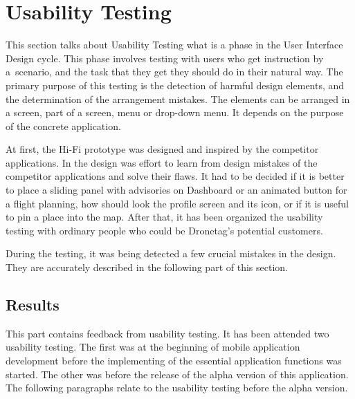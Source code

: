 \section{Usability Testing}\label{sec:usability-testing}

This section talks about Usability Testing what is a phase in the User Interface Design cycle.
This phase involves testing with users who get instruction by a~scenario, and the task that they get they should do in their natural way.
The primary purpose of this testing is the detection of harmful design elements, and the determination of the arrangement mistakes.
The elements can be arranged in a screen, part of a screen, menu or drop-down menu.
It depends on the purpose of the concrete application.

At first, the Hi-Fi prototype was designed and inspired by the competitor applications.
In the design was effort to learn from design mistakes of the competitor applications and solve their flaws.
It had to be decided if it is better to place a sliding panel with advisories on Dashboard or an animated button for a flight planning, how should look the profile screen and its icon, or if it is useful to pin a place into the map.
After that, it has been organized the usability testing with ordinary people who could be Dronetag's potential customers.

During the testing, it was being detected a few crucial mistakes in the design.
They are accurately described in the following part of this section.

\subsection{Results}\label{subsec:results}
This part contains feedback from usability testing.
It has been attended two usability testing.
The first was at the beginning of mobile application development before the implementing of the essential application functions was started.
The other was before the release of the alpha version of this application.
The following paragraphs relate to the usability testing before the alpha version.

